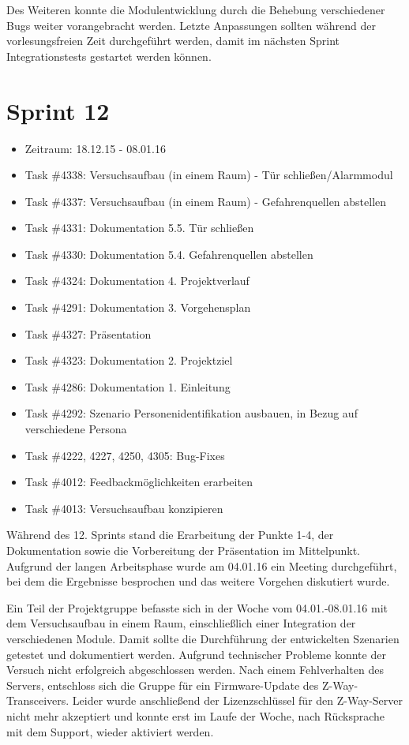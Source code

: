 \documentclass[12pt, oneside, smallheadings]{scrbook}
\begin{document}
Des Weiteren konnte die Modulentwicklung durch die Behebung verschiedener Bugs weiter vorangebracht werden. Letzte Anpassungen sollten während der vorlesungsfreien Zeit durchgeführt werden, damit im nächsten Sprint Integrationstests gestartet werden können.

\section{Sprint 12}
\begin{itemize}
	\item Zeitraum: 18.12.15 - 08.01.16 \newline
	\item Task \#4338: Versuchsaufbau (in einem Raum) - Tür schließen/Alarmmodul
	\item Task \#4337: Versuchsaufbau (in einem Raum) - Gefahrenquellen abstellen
	\item Task \#4331: Dokumentation 5.5. Tür schließen %
	\item Task \#4330: Dokumentation 5.4. Gefahrenquellen abstellen
	\item Task \#4324: Dokumentation 4. Projektverlauf
	\item Task \#4291: Dokumentation 3. Vorgehensplan
	\item Task \#4327: Präsentation
	\item Task \#4323: Dokumentation 2. Projektziel
	\item Task \#4286: Dokumentation 1. Einleitung
	\item Task \#4292: Szenario Personenidentifikation ausbauen, in Bezug auf verschiedene Persona
	\item Task \#4222, 4227, 4250, 4305: Bug-Fixes
	\item Task \#4012: Feedbackmöglichkeiten erarbeiten
	\item Task \#4013: Versuchsaufbau konzipieren\\
\end{itemize}
\noindent
Während des 12. Sprints stand die Erarbeitung der Punkte 1-4, der Dokumentation sowie die Vorbereitung der Präsentation im Mittelpunkt. Aufgrund der langen Arbeitsphase wurde am 04.01.16 ein Meeting durchgeführt, bei dem die Ergebnisse besprochen und das weitere Vorgehen diskutiert wurde.

Ein Teil der Projektgruppe befasste sich in der Woche vom 04.01.-08.01.16 mit dem Versuchsaufbau in einem Raum, einschließlich einer Integration der verschiedenen Module. Damit sollte die Durchführung der entwickelten Szenarien getestet und dokumentiert werden. Aufgrund technischer Probleme konnte der Versuch nicht erfolgreich abgeschlossen werden. Nach einem Fehlverhalten des Servers, entschloss sich die Gruppe für ein Firmware-Update des Z-Way-Transceivers. Leider wurde anschließend der Lizenzschlüssel für den Z-Way-Server nicht mehr akzeptiert und konnte erst im Laufe der Woche, nach Rücksprache mit dem Support, wieder aktiviert werden.
\end{document}
